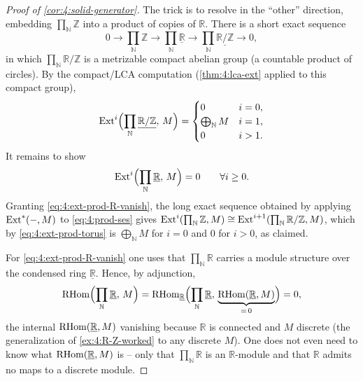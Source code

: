 \begin{proof}[Proof of \cref{cor:4:solid-generator}]
The trick is to resolve in the ``other'' direction, embedding
$\prod_{\mathbb{N}}\mathbb{Z}$ into a product of copies of $\mathbb{R}$. There is a
short exact sequence
\begin{equation}
\label{eq:4:prod-ses}
0\to\prod_{\mathbb{N}}\mathbb{Z}\to\prod_{\mathbb{N}}\underline{\mathbb{R}}\to
\prod_{\mathbb{N}}\underline{\mathbb{R}/\mathbb{Z}}\to0,
\end{equation}
in which $\prod_{\mathbb{N}}\mathbb{R}/\mathbb{Z}$ is a metrizable compact abelian
group (a countable product of circles). By the compact/LCA computation
(\cref{thm:4:lca-ext} applied to this compact group),
\begin{equation}
\label{eq:4:ext-prod-torus}
\operatorname{Ext}^{i}\Bigl(\prod_{\mathbb{N}}\underline{\mathbb{R}/\mathbb{Z}},\,M\Bigr)=
\begin{cases}
0 & i=0,\\
\bigoplus_{\mathbb{N}}M & i=1,\\
0 & i>1.
\end{cases}
\end{equation}
It remains to show
\begin{equation}
\label{eq:4:ext-prod-R-vanish}
\operatorname{Ext}^{i}\Bigl(\prod_{\mathbb{N}}\underline{\mathbb{R}},\,M\Bigr)=0
\qquad\forall i\geq0.
\end{equation}
Granting \eqref{eq:4:ext-prod-R-vanish}, the long exact sequence obtained by
applying $\operatorname{Ext}^{\ast}(-,M)$ to \eqref{eq:4:prod-ses} gives
$\operatorname{Ext}^{i}(\prod_{\mathbb{N}}\mathbb{Z},M)\cong
\operatorname{Ext}^{i+1}(\prod_{\mathbb{N}}\mathbb{R}/\mathbb{Z},M)$, which by
\eqref{eq:4:ext-prod-torus} is $\bigoplus_{\mathbb{N}}M$ for $i=0$ and $0$ for
$i>0$, as claimed.

For \eqref{eq:4:ext-prod-R-vanish} one uses that $\prod_{\mathbb{N}}\mathbb{R}$
carries a module structure over the condensed ring $\underline{\mathbb{R}}$.
Hence, by adjunction,
\begin{equation*}
\mathrm{RHom}\Bigl(\prod_{\mathbb{N}}\underline{\mathbb{R}},\,M\Bigr)
=\mathrm{RHom}_{\underline{\mathbb{R}}}\Bigl(\prod_{\mathbb{N}}\underline{\mathbb{R}},\,
\underbrace{\mathrm{RHom}(\underline{\mathbb{R}},M)}_{=\,0}\Bigr)=0,
\end{equation*}
the internal $\mathrm{RHom}(\underline{\mathbb{R}},M)$ vanishing because $\mathbb{R}$ is
connected and $M$ discrete (the generalization of \cref{ex:4:R-Z-worked} to any
discrete $M$). One does not even need to know what
$\mathrm{RHom}(\underline{\mathbb{R}},M)$ is -- only that
$\prod_{\mathbb{N}}\mathbb{R}$ is an $\mathbb{R}$-module and that $\mathbb{R}$
admits no maps to a discrete module.
\end{proof}

